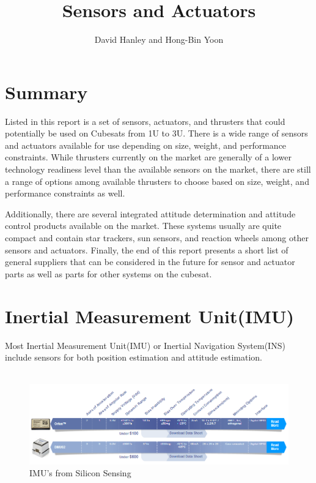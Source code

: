 \documentclass[english]{article}
\begin{document}
\title{Sensors and Actuators}


\author{David Hanley and Hong-Bin Yoon}

\maketitle

\section{Summary}
Listed in this report is a set of sensors, actuators, and thrusters that could potentially be used on Cubesats from 1U to 3U. There is a wide range of sensors and actuators available for use depending on size, weight, and performance constraints. While thrusters currently on the market are generally of a lower technology readiness level than the available sensors on the market, there are still a range of options among available thrusters to choose based on size, weight, and performance constraints as well. 

Additionally, there are several integrated attitude determination and attitude control products available on the market. These systems usually are quite compact and contain star trackers, sun sensors, and reaction wheels among other sensors and actuators. Finally, the end of this report presents a short list of general suppliers that can be considered in the future for sensor and actuator parts as well as parts for other systems on the cubesat. 

\section{Inertial Measurement Unit(IMU)}

Most Inertial Measurement Unit(IMU) or Inertial Navigation System(INS) include sensors for both position estimation and attitude estimation. \\\\


\begin{figure}[h!]
   \includegraphics[scale=0.6]{../IMU/siliconSensing_IMU}
   \caption{IMU's from Silicon Sensing \cite{imu1}}
\end{figure}
\end{document}
